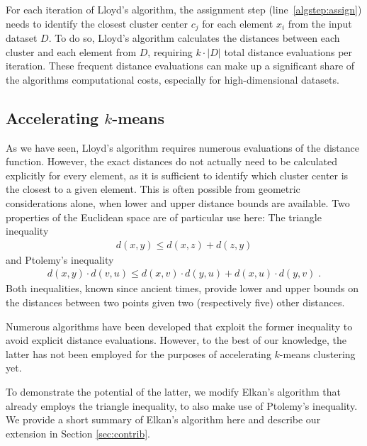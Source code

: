 For each iteration of Lloyd's algorithm, the assignment step (line~\autoref{algstep:assign}) needs to identify the closest cluster center $c_j$ for each element $x_i$ from the input dataset $D$.
To do so, Lloyd's algorithm calculates the distances between each cluster and each element from $D$, requiring $k\cdot|D|$ total distance evaluations per iteration.
These frequent distance evaluations can make up a significant share of the algorithms computational costs, especially for high-dimensional datasets.


\subsection{Accelerating $k$-means}
\label{sub:acc}



As we have seen, Lloyd's algorithm requires numerous evaluations of the distance function.
However, the exact distances do not actually need to be calculated explicitly for every element, as it is sufficient to identify which cluster center is the closest to a given element.
This is often possible from geometric considerations alone, when lower and upper distance bounds are available.
Two properties of the Euclidean space are of particular use here:
The triangle inequality
\begin{align}
	\label{eq:tri}
	d(x,y) \leq d(x,z) + d(z,y)
\end{align}
and Ptolemy's inequality
\begin{align}
	\label{eq:pto}
	d(x, y)\cdot d(v, u) \leq d(x, v) \cdot d(y,u) + d(x, u) \cdot d(y, v)\;.
\end{align}
Both inequalities, known since ancient times, provide lower and upper bounds on the distances between two points given two (respectively five) other distances.

Numerous algorithms have been developed that exploit the former inequality to avoid explicit distance evaluations. However, to the best of our knowledge, the latter has not been employed for the purposes of accelerating $k$-means clustering yet.

To demonstrate the potential of the latter, we modify Elkan's algorithm \cite{DBLP:conf/icml/Elkan03} that already employs the triangle inequality, to also make use of Ptolemy's inequality.
We provide a short summary of Elkan's algorithm here and describe our extension in Section \ref{sec:contrib}.

